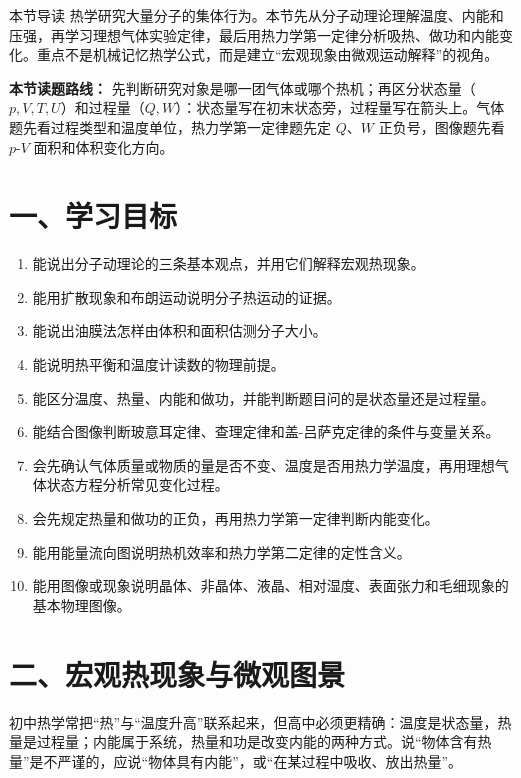 
\begin{learningbox}{本节导读}
热学研究大量分子的集体行为。本节先从分子动理论理解温度、内能和压强，再学习理想气体实验定律，最后用热力学第一定律分析吸热、做功和内能变化。重点不是机械记忆热学公式，而是建立“宏观现象由微观运动解释”的视角。
\end{learningbox}

\textbf{本节读题路线：} 先判断研究对象是哪一团气体或哪个热机；再区分状态量（$p,V,T,U$）和过程量（$Q,W$）：状态量写在初末状态旁，过程量写在箭头上。气体题先看过程类型和温度单位，热力学第一定律题先定 $Q$、$W$ 正负号，图像题先看 $p$-$V$ 面积和体积变化方向。

\section*{一、学习目标}
\begin{enumerate}
  \item 能说出分子动理论的三条基本观点，并用它们解释宏观热现象。
  \item 能用扩散现象和布朗运动说明分子热运动的证据。
  \item 能说出油膜法怎样由体积和面积估测分子大小。
  \item 能说明热平衡和温度计读数的物理前提。
  \item 能区分温度、热量、内能和做功，并能判断题目问的是状态量还是过程量。
  \item 能结合图像判断玻意耳定律、查理定律和盖-吕萨克定律的条件与变量关系。
  \item 会先确认气体质量或物质的量是否不变、温度是否用热力学温度，再用理想气体状态方程分析常见变化过程。
  \item 会先规定热量和做功的正负，再用热力学第一定律判断内能变化。
  \item 能用能量流向图说明热机效率和热力学第二定律的定性含义。
  \item 能用图像或现象说明晶体、非晶体、液晶、相对湿度、表面张力和毛细现象的基本物理图像。
\end{enumerate}
\section*{二、宏观热现象与微观图景}

初中热学常把“热”与“温度升高”联系起来，但高中必须更精确：温度是状态量，热量是过程量；内能属于系统，热量和功是改变内能的两种方式。说“物体含有热量”是不严谨的，应说“物体具有内能”，或“在某过程中吸收、放出热量”。

